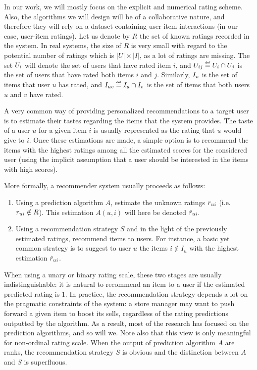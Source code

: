 In our work, we will mostly focus on the explicit and numerical rating scheme.
Also, the algorithms we will design will be of a collaborative nature, and
therefore they will rely on a dataset containing user-item interactions (in our
case, user-item ratings).
Let us denote by $R$ the set of known ratings recorded in the system. In real
systems, the size of $R$ is very small with regard to the potential number of
ratings which is $|U| \times |I|$, as a lot of ratings are missing. The set
$U_i$ will denote the set of users that have rated item $i$, and $\Uij \eqdef
U_i \cap U_j$ is the set of users that have rated both items $i$ and $j$.
Similarly, $I_u$ is the set of items that user $u$ has rated, and $\Iuv \eqdef
I_u \cap I_v$ is the set of items that both users $u$ and $v$ have rated.

A very common way of providing personalized recommendations to a target user is
to estimate their tastes regarding the items that the system provides. The taste of a
user $u$ for a given item $i$ is usually represented as the rating that $u$
would give to $i$.  Once these estimations are made, a simple option is to
recommend the items with the highest ratings among all the estimated scores for
the considered user (using the implicit assumption that a user should be
interested in the items with high scores).

More formally, a recommender system usually proceeds as follows:
\begin{enumerate}
\item Using a prediction algorithm $A$, estimate the unknown ratings $r_{ui}$
  (i.e. $r_{ui} \notin R$). This estimation $A(u, i)$ will here be denoted
    $\hat{r}_{ui}$.
\item Using a recommendation strategy $S$ and in the light of the previously
  estimated ratings, recommend items to users. For instance, a basic yet common
    strategy is to suggest to user $u$ the items $i \notin I_u$ with the
    highest estimation $\hat{r}_{ui}$.
\end{enumerate}

When using a unary or binary rating scale, these two stages are usually
indistinguishable: it is natural to recommend an item to a user if the
estimated predicted rating is $1$. In practice, the recommendation strategy
depends a lot on the pragmatic constraints of the system: a store manager may
want to push forward a given item to boost its sells, regardless of the
rating predictions outputted by the algorithm. As a result, most of the
research has focused on the prediction algorithms, and so will we. Note also
that this view is only meaningful for non-ordinal rating scale. When the output
of prediction algorithm $A$ are ranks, the recommendation strategy $S$ is
obvious and the distinction between $A$ and $S$ is superfluous.

